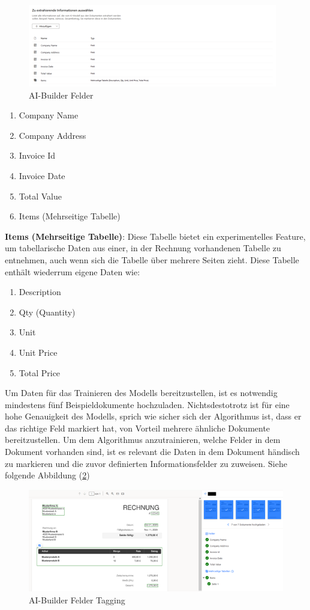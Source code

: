 \begin{figure}[h]
    \centering
    \includegraphics[scale=0.9]{sections/cloud-computing/images/ai-builder-fields.png}
    \caption{AI-Builder Felder}
    \label{fig:ai-builder-fields-figure}
\end{figure}

\begin{enumerate}
    \item Company Name
    \item Company Address
    \item Invoice Id
    \item Invoice Date
    \item Total Value
    \item Items (Mehrseitige Tabelle)
\end{enumerate}

\textbf{Items (Mehrseitige Tabelle)}: Diese Tabelle bietet ein experimentelles Feature, um tabellarische Daten aus einer, in der Rechnung vorhandenen Tabelle zu entnehmen, auch wenn sich die Tabelle über mehrere Seiten zieht. Diese Tabelle enthält wiederrum eigene Daten wie:

\label{enum:InvoiceItemsAttributs}
\begin{enumerate}
    \item Description
    \item Qty (Quantity)
    \item Unit
    \item Unit Price
    \item Total Price
\end{enumerate}


Um Daten für das Trainieren des Modells bereitzustellen, ist es notwendig mindestens fünf Beispieldokumente hochzuladen. Nichtsdestotrotz ist für eine hohe Genauigkeit des Modells, sprich wie sicher sich der Algorithmus ist, dass er das richtige Feld markiert hat, von Vorteil mehrere ähnliche Dokumente bereitzustellen. 
Um dem Algorithmus anzutrainieren, welche Felder in dem Dokument vorhanden sind, ist es relevant die Daten in dem Dokument händisch zu markieren und die zuvor definierten Informationsfelder zu zuweisen. Siehe folgende Abbildung (\ref{fig:ai-builder-tagging-figure})

\begin{figure}[h]
    \centering
    \includegraphics[scale=0.9]{sections/cloud-computing/images/ai-builder-tagging.png}
    \caption{AI-Builder Felder Tagging}
    \label{fig:ai-builder-tagging-figure}
\end{figure}